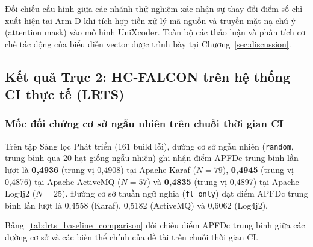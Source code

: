 Đối chiếu cấu hình giữa các nhánh thử nghiệm xác nhận sự thay đổi điểm số chỉ xuất hiện tại Arm D khi tích hợp tiền xử lý mã nguồn và truyền mặt nạ chú ý (attention mask) vào mô hình UniXcoder. Toàn bộ các thảo luận và phân tích cơ chế tác động của biểu diễn vector được trình bày tại Chương~\ref{sec:discussion}.

\subsection{Kết quả Trục 2: HC-FALCON trên hệ thống CI thực tế (LRTS)}
\label{subsec:rq2_lrts_results}

\subsubsection{Mốc đối chứng cơ sở ngẫu nhiên trên chuỗi thời gian CI}
\label{subsubsec:random_baseline_lrts}

Trên tập Sàng lọc Phát triển (161 build lỗi), đường cơ sở ngẫu nhiên (\texttt{random}, trung bình qua 20 hạt giống ngẫu nhiên) ghi nhận điểm APFDc trung bình lần lượt là \textbf{0,4936} (trung vị 0,4908) tại Apache Karaf ($N=79$), \textbf{0,4945} (trung vị 0,4876) tại Apache ActiveMQ ($N=57$) và \textbf{0,4835} (trung vị 0,4897) tại Apache Log4j2 ($N=25$). Đường cơ sở thuần ngữ nghĩa (\texttt{fl\_only}) đạt điểm APFDc trung bình lần lượt là 0,4558 (Karaf), 0,5182 (ActiveMQ) và 0,6062 (Log4j2).

Bảng~\ref{tab:lrts_baseline_comparison} đối chiếu điểm APFDc trung bình giữa các đường cơ sở và các biến thể chính của đề tài trên chuỗi thời gian CI.

